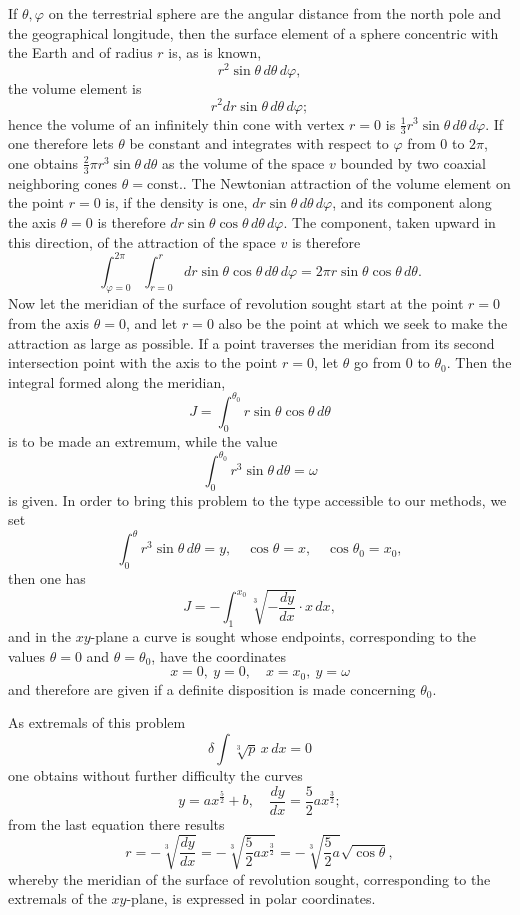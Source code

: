 \documentclass[11pt,a4paper,leqno]{article}
\begin{document}
If $\theta,\varphi$ on the terrestrial sphere are the angular distance from the north pole and the geographical longitude, then the surface element of a sphere concentric with the Earth and of radius $r$ is, as is known,
\[
r^2\sin\theta\,d\theta\,d\varphi,
\]
the volume element is
\[
r^2dr\sin\theta\,d\theta\,d\varphi;
\]
hence the volume of an infinitely thin cone with vertex $r=0$ is $\frac13 r^3\sin\theta\,d\theta\,d\varphi$. If one therefore lets $\theta$ be constant and integrates with respect to $\varphi$ from 0 to $2\pi$, one obtains $\frac23\pi r^3\sin\theta\,d\theta$ as the volume of the space $v$ bounded by two coaxial neighboring cones $\theta=\mathrm{const.}$. The Newtonian attraction of the volume element on the point $r=0$ is, if the density is one, $dr\sin\theta\,d\theta\,d\varphi$, and its component along the axis $\theta=0$ is therefore $dr\sin\theta\cos\theta\,d\theta\,d\varphi$. The component, taken upward in this direction, of the attraction of the space $v$ is therefore
\[
\int_{\varphi=0}^{2\pi}\int_{r=0}^{r}dr\sin\theta\cos\theta\,d\theta\,d\varphi=2\pi r\sin\theta\cos\theta\,d\theta.
\]
Now let the meridian of the surface of revolution sought start at the point $r=0$ from the axis $\theta=0$, and let $r=0$ also be the point at which we seek to make the attraction as large as possible. If a point traverses the meridian from its second intersection point with the axis to the point $r=0$, let $\theta$ go from 0 to $\theta_0$. Then the integral formed along the meridian,
\[
J=\int_0^{\theta_0} r\sin\theta\cos\theta\,d\theta
\]
is to be made an extremum, while the value
\[
\int_0^{\theta_0} r^3\sin\theta\,d\theta=\omega
\]
is given. In order to bring this problem to the type accessible to our methods, we set
\[
\int_0^\theta r^3\sin\theta\,d\theta=y,
\quad \cos\theta=x,
\quad \cos\theta_0=x_0,
\]
then one has
\[
J=-\int_1^{x_0}\sqrt[3]{-\frac{dy}{dx}}\cdot x\,dx,
\]
and in the $xy$-plane a curve is sought whose endpoints, corresponding to the values $\theta=0$ and $\theta=\theta_0$, have the coordinates
\[
x=0,\ y=0,\quad x=x_0,\ y=\omega
\]
and therefore are given if a definite disposition is made concerning $\theta_0$.

As extremals of this problem
\[
\delta\int \sqrt[3]{p}\,x\,dx=0
\]
one obtains without further difficulty the curves
\[
y=ax^{\frac52}+b,\quad \frac{dy}{dx}=\frac52 ax^{\frac32};
\]
from the last equation there results
\[
r=-\sqrt[3]{\frac{dy}{dx}}=-\sqrt[3]{\frac52 ax^{\frac32}}=-\sqrt[3]{\frac52a}\sqrt{\cos\theta},
\]
whereby the meridian of the surface of revolution sought, corresponding to the extremals of the $xy$-plane, is expressed in polar coordinates.
\end{document}
